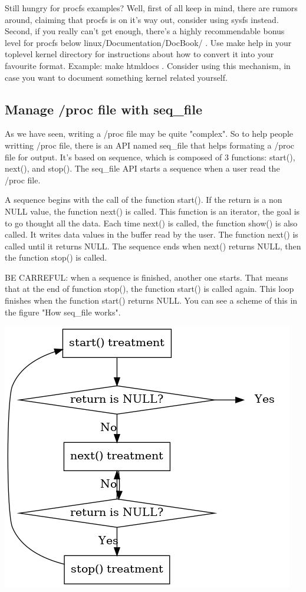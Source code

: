 \documentclass[11pt]{article}
\begin{document}
Still hungry for procfs examples? Well, first of all keep in mind, there are rumors around, claiming that procfs is on it's way out, consider using sysfs instead. Second, if you really can't get enough, there's a highly recommendable bonus level for procfs below linux/Documentation/DocBook/ . Use make help in your toplevel kernel directory for instructions about how to convert it into your favourite format. Example: make htmldocs . Consider using this mechanism, in case you want to document something kernel related yourself.

\subsection*{Manage /proc file with seq\_file}
\label{sec-7-3}
As we have seen, writing a /proc file may be quite "complex". So to help
people writting /proc file, there is an API named seq\_file that helps
formating a /proc file for output. It's based on sequence, which is composed of 3 functions: start(), next(), and stop(). The seq\_file API starts a sequence when a user read the /proc file.

A sequence begins with the call of the function start(). If the return is a
non NULL value, the function next() is called. This function is an iterator, the goal is to go thought all the data. Each time next() is called, the function show() is also called. It writes data values in the buffer read by the user. The function next() is called until it returns NULL. The sequence ends when next() returns NULL, then the function stop() is called.

BE CARREFUL: when a sequence is finished, another one starts. That means that at the end of function stop(), the function start() is called again. This loop finishes when the function start() returns NULL. You can see a scheme of this in the figure "How seq\_file works".

\includegraphics[width=.9\linewidth]{img/seq_file.png}
\end{document}
